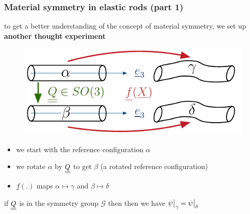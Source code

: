 \begin{frame}
  \frametitle{Material symmetry in elastic rods (part 1)}
  
  to get a better understanding of the concept of material symmetry, \newline
  we set up \textbf{another thought experiment}
  \vspace{0.5em}
  \begin{figure}
    \centering
    \includegraphics[width=18cm, keepaspectratio=true]{sections/cosserat_rods/images/MaterialSymmetryExperiment}
  \end{figure}
  \begin{itemize}
    \item we start with the reference configuration $\alpha$
    \item we rotate $\alpha$ by $\underline{\underline{Q}}$ to get $\beta$ (a rotated reference configuration)
    \item $\underline{f}(.)$ maps $\alpha \mapsto \gamma$ and $\beta \mapsto \delta$
  \end{itemize}
  
  if $\underline{\underline{Q}}$ is in the symmetry group $\mathscr{G}$ then then we have $\eval[1]{\psi}_{\gamma} = \eval[1]{\psi}_{\delta}$
\end{frame}


